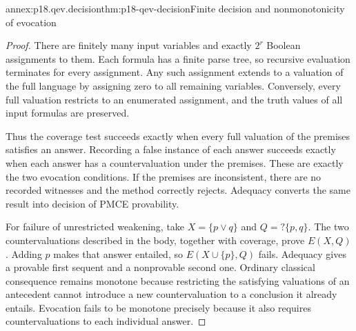 \begin{annexitem}{annex:p18.qev.decision}{thm:p18-qev-decision}{Finite decision and nonmonotonicity of evocation}
\begin{proof}
There are finitely many input variables and exactly \(2^r\) Boolean
assignments to them. Each formula has a finite parse tree, so recursive
evaluation terminates for every assignment. Any such assignment extends
to a valuation of the full language by assigning zero to all remaining
variables. Conversely, every full valuation restricts to an enumerated
assignment, and the truth values of all input formulas are preserved.

Thus the coverage test succeeds exactly when every full valuation of
the premises satisfies an answer. Recording a false instance of each
answer succeeds exactly when each answer has a countervaluation under
the premises. These are exactly the two evocation conditions. If the
premises are inconsistent, there are no recorded witnesses and the
method correctly rejects. Adequacy converts the same result into
decision of PMCE provability.

For failure of unrestricted weakening, take \(X=\{p\lor q\}\)
and \(Q=?\{p,q\}\). The two countervaluations described in the
body, together with coverage, prove \(E(X,Q)\). Adding \(p\)
makes that answer entailed, so \(E(X\cup\{p\},Q)\) fails.
Adequacy gives a provable first sequent and a nonprovable second one.
Ordinary classical consequence remains monotone because restricting
the satisfying valuations of an antecedent cannot introduce a new
countervaluation to a conclusion it already entails. Evocation fails
to be monotone precisely because it also requires countervaluations
to each individual answer.
\end{proof}
\end{annexitem}
